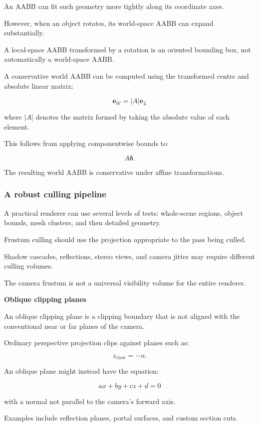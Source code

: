 An AABB can fit such geometry more tightly along its coordinate axes.

However, when an object rotates, its world-space AABB can expand substantially.

A local-space AABB transformed by a rotation is an oriented bounding box, not automatically a world-space AABB.

A conservative world AABB can be computed using the transformed centre and absolute linear matrix:

\[
 \boxed{ \mathbf e_W=|A|\mathbf e_L }
\]

where \(|A|\) denotes the matrix formed by taking the absolute value of each element.

This follows from applying componentwise bounds to:

\[
 A\boldsymbol\delta.
\]

The resulting world AABB is conservative under affine transformations.

\subsubsection{A robust culling pipeline}\label{a-robust-culling-pipeline}

A practical renderer can use several levels of tests: whole-scene regions, object bounds, mesh clusters, and then detailed geometry.

Frustum culling should use the projection appropriate to the pass being culled.

Shadow cascades, reflections, stereo views, and camera jitter may require different culling volumes.

The camera frustum is not a universal visibility volume for the entire renderer.

\textbf{Oblique clipping planes}

An oblique clipping plane is a clipping boundary that is not aligned with the conventional near or far planes of the camera.

Ordinary perspective projection clips against planes such as:

\[
 z_{\mathrm{view}}=-n.
\]

An oblique plane might instead have the equation:

\[
 \boxed{ ax+by+cz+d=0 }
\]

with a normal not parallel to the camera's forward axis.

Examples include reflection planes, portal surfaces, and custom section cuts.

